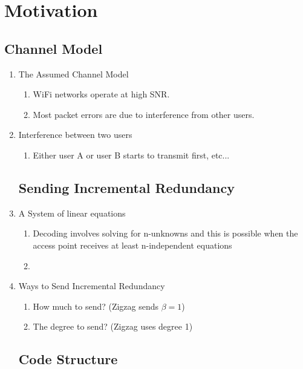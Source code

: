 \section{Motivation}
\label{sec:motivation}

\subsection{Channel Model}
\label{sec:model}

\begin{enumerate}
	\item The Assumed Channel Model
	\begin{enumerate}
		\item WiFi networks operate at high SNR.
		\item Most packet errors are due to interference from other users.
	\end{enumerate}

	\item Interference between two users
	\begin{enumerate}
		\item Either user A or user B starts to transmit first, etc...
	\end{enumerate}

\subsection{Sending Incremental Redundancy}
\label{sec:ir}

	\item A System of linear equations
	\begin{enumerate}	
		\item Decoding involves solving for n-unknowns and this is possible when the access point receives at least n-independent equations
		\item <Insert Analysis of necessary number of equations needed for successful decode>
	\end{enumerate}

	\item Ways to Send Incremental Redundancy
	\begin{enumerate}	
		\item How much to send? (Zigzag sends $\beta=1$)
		\item The degree to send? (Zigzag uses degree 1)
	\end{enumerate}

\subsection{Code Structure}
\label{sec:structure}


\end{enumerate}
